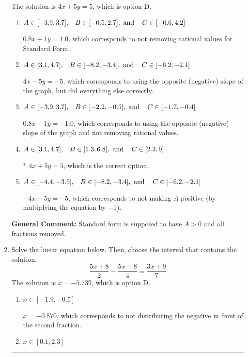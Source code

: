 \documentclass{extbook}[14pt]
\newcommand{\litem}[1]{\item #1

\rule{\textwidth}{0.4pt}}
\begin{document}
\begin{enumerate}
{The solution is \( 4x + 5y = 5 \), which is option D.\begin{enumerate}[label=\Alph*.]
\item \( A \in [-3.9, 3.7], \hspace{3mm} B \in [-0.5, 2.7], \text{ and } \hspace{3mm} C \in [-0.6, 4.2] \)

 $0.8x + 1y = 1.0$, which corresponds to not removing rational values for Standard Form.
\item \( A \in [3.1, 4.7], \hspace{3mm} B \in [-8.2, -3.4], \text{ and } \hspace{3mm} C \in [-6.2, -2.1] \)

 $4x - 5y = -5$, which corresponds to using the opposite (negative) slope of the graph, but did everything else correctly.
\item \( A \in [-3.9, 3.7], \hspace{3mm} B \in [-2.2, -0.5], \text{ and } \hspace{3mm} C \in [-1.7, -0.4] \)

 $0.8x - 1y = -1.0$, which corresponds to using the opposite (negative) slope of the graph and not removing rational values.
\item \( A \in [3.1, 4.7], \hspace{3mm} B \in [1.3, 6.8], \text{ and } \hspace{3mm} C \in [2.2, 9] \)

* $4x + 5y = 5$, which is the correct option.
\item \( A \in [-4.4, -3.5], \hspace{3mm} B \in [-8.2, -3.4], \text{ and } \hspace{3mm} C \in [-6.2, -2.1] \)

 $-4x - 5y = -5$, which corresponds to not making $A$ positive (by multiplying the equation by $-1$).
\end{enumerate}

\textbf{General Comment:} Standard form is supposed to have $A > 0$ and all fractions removed.
}
\litem{
Solve the linear equation below. Then, choose the interval that contains the solution.
\[ \frac{5x + 8}{2} - \frac{5x -8}{4} = \frac{3x + 9}{7} \]The solution is \( x = -5.739 \), which is option D.\begin{enumerate}[label=\Alph*.]
\item \( x \in [-1.9, -0.5] \)

 $x = -0.870$, which corresponds to not distributing the negative in front of the second fraction.
\item \( x \in [0.1, 2.3] \)


\end{enumerate}}
\end{enumerate}
\end{document}
